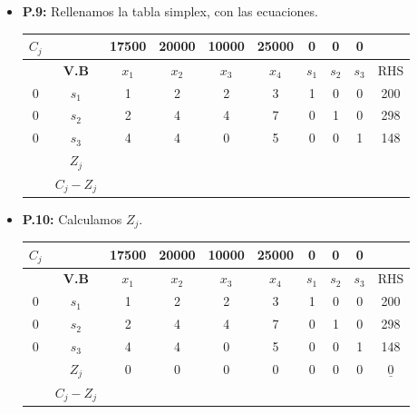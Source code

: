 \documentclass{templateNote}
\begin{document}
\begin{itemize}
    \item \textbf{P.9:} Rellenamos la tabla simplex, con las ecuaciones.
    \begin{center}
        \begin{tabular}{|c|c|c|c|c|c|c|c|c|c|}
            \hline
            $C_j$ & & 17500 & 20000 & 10000 & 25000 & 0 & 0 & 0 & \\ \hline
            & \textbf{V.B} & $x_1$ & $x_2$ & $x_3$ & $x_4$ & $s_1$ & $s_2$ & $s_3$ & RHS \\ \hline
            0 & $s_1$ & 1 & 2 & 2 & 3 & 1 & 0 & 0 & 200 \\
            0 & $s_2$ & 2 & 4 & 4 & 7 & 0 & 1 & 0 & 298 \\
            0 & $s_3$ & 4 & 4 & 0 & 5 & 0 & 0 & 1 & 148 \\ \hline
            & $Z_j$ & & & & & & & & \\ \hline
            & $C_j - Z_j$ & & & & & & & & \\ \hline
        \end{tabular}
    \end{center}

    \item \textbf{P.10:} Calculamos $Z_j$.
    \begin{center}
        \begin{tabular}{|c|c|c|c|c|c|c|c|c|c|}
            \hline
            $C_j$ & & 17500 & 20000 & 10000 & 25000 & 0 & 0 & 0 & \\ \hline
            & \textbf{V.B} & $x_1$ & $x_2$ & $x_3$ & $x_4$ & $s_1$ & $s_2$ & $s_3$ & RHS \\ \hline
            0 & $s_1$ & 1 & 2 & 2 & 3 & 1 & 0 & 0 & 200 \\
            0 & $s_2$ & 2 & 4 & 4 & 7 & 0 & 1 & 0 & 298 \\
            0 & $s_3$ & 4 & 4 & 0 & 5 & 0 & 0 & 1 & 148 \\ \hline
            & $Z_j$ & 0 & 0 & 0 & 0 & 0 & 0 & 0 & $\underline{0}$ \\ \hline
            & $C_j - Z_j$ & & & & & & & & \\ \hline
        \end{tabular}
    \end{center}


\end{itemize}
\end{document}
